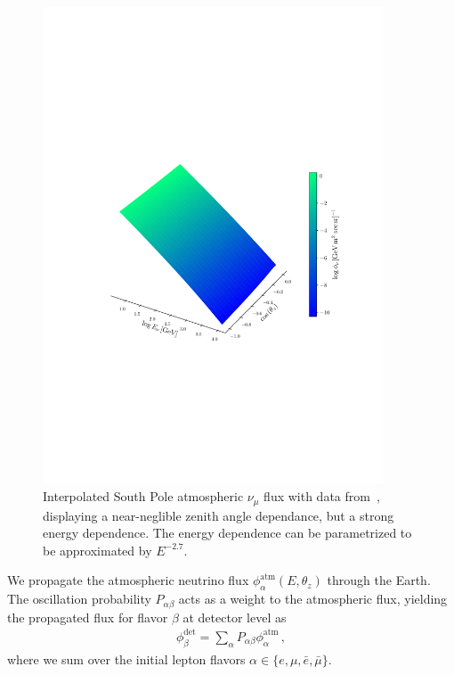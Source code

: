 \begin{figure}[t]\label{fig:flux}
    \centering
    \includegraphics[width=0.9\textwidth]{figures/flux.pdf}
    \caption{Interpolated South Pole atmospheric $\nu_\mu$ flux with data from~\cite{hondaArticle}, displaying a near-neglible 
    zenith angle dependance, but a strong energy dependence. The energy dependence can be parametrized to be approximated by $E^{-2.7}$.}
\end{figure}

We propagate the atmospheric neutrino flux $\phi_\alpha^\text{atm}(E,\theta_z)$ through the Earth.
The oscillation probability $P_{\alpha \beta}$ acts as a weight to the atmospheric flux, yielding the propagated flux for flavor $\beta$ at detector level as 
\begin{align}\label{eq:propFlux}
    \phi_\beta^\text{det} = \sum_\alpha P_{\alpha\beta} \phi_\alpha^\text{atm} \,,
\end{align}
where we sum over the initial lepton flavors $\alpha \in \{e,\mu, \bar{e}, \bar{\mu}\}$.

